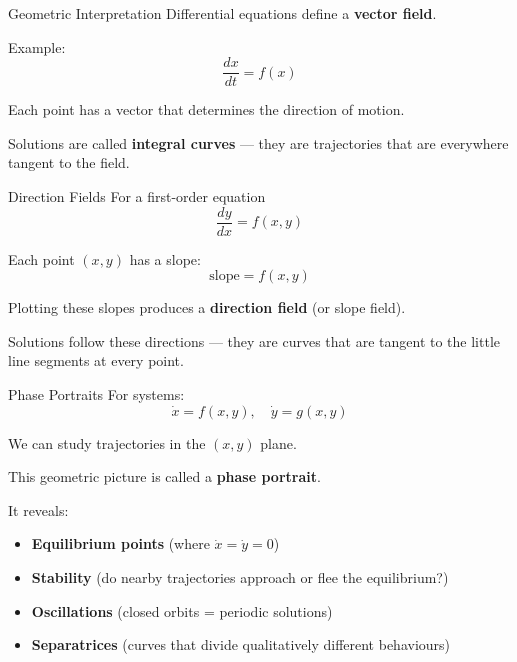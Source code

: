 
\begin{frame}{Geometric Interpretation}
Differential equations define a \textbf{vector field}.

Example:
\[
\frac{dx}{dt} = f(x)
\]

Each point has a vector that determines the direction of motion.

Solutions are called \textbf{integral curves} --- they are trajectories that are everywhere tangent to the field.
\end{frame}


\begin{frame}{Direction Fields}
For a first-order equation
\[
\frac{dy}{dx} = f(x,y)
\]

Each point $(x,y)$ has a slope:
\[
\text{slope} = f(x,y)
\]

Plotting these slopes produces a \textbf{direction field} (or slope field).

Solutions follow these directions --- they are curves that are tangent to the little line segments at every point.
\end{frame}

\begin{frame}{Phase Portraits}
For systems:
\[
\dot{x} = f(x,y), \quad \dot{y} = g(x,y)
\]

We can study trajectories in the $(x,y)$ plane.

This geometric picture is called a \textbf{phase portrait}.

It reveals:
\begin{itemize}
    \item \textbf{Equilibrium points} (where $\dot{x} = \dot{y} = 0$)
    \item \textbf{Stability} (do nearby trajectories approach or flee the equilibrium?)
    \item \textbf{Oscillations} (closed orbits = periodic solutions)
    \item \textbf{Separatrices} (curves that divide qualitatively different behaviours)
\end{itemize}
\end{frame}


